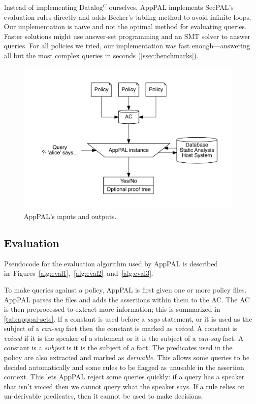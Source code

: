 \documentclass[thesis.tex]{subfiles}
\begin{document}
Instead of implementing Datalog$^C$ ourselves, AppPAL implements
SecPAL's evaluation rules directly and adds Becker's tabling
method to avoid infinite loops. Our implementation is na\"ive and not
the optimal method for evaluating queries. Faster solutions might use
answer-set programming and an SMT solver to answer queries. For all
policies we tried, our implementation was fast enough---answering all
but the most complex queries in seconds (\autoref{ssec:benchmarks}).

\begin{figure}
  \centering
  \includegraphics[width=\linewidth]{figures/apppal-evaluation.pdf}
  \caption{AppPAL's inputs and outputs.}
  \label{fig:apppal-inputs-outputs}
\end{figure}

\subsection{Evaluation}
\label{ssec:evaluation-alg}

Pseudocode for the evaluation algorithm used by AppPAL is described
in~Figures~\ref{alg:eval1},~\ref{alg:eval2}~and~\ref{alg:eval3}.

To make queries against a policy, AppPAL is first given one or more policy files.
AppPAL parses the files and adds the assertions within them to the \ac{AC}. The
AC is then preprocessed to extract more information; this is summarized in
\autoref{tab:apppal-sets}. If a constant is used before a \emph{says} statement,
or it is used as the subject of a \emph{can-say} fact then the constant is
marked as \emph{voiced}. A constant is \emph{voiced} if it is the speaker of a
statement or it is the subject of a \emph{can-say} fact. A constant is a
\emph{subject} is it is the subject of a fact. The predicates used in the policy
are also extracted and marked as \emph{derivable}. This allows some queries to
be decided automatically and some rules to be flagged as unusable in the
assertion context. This lets AppPAL reject some queries quickly: if a query has
a speaker that isn't voiced then we cannot query what the speaker says. If a
rule relies on un-derivable predicates, then it cannot be used to make decisions.
\end{document}
